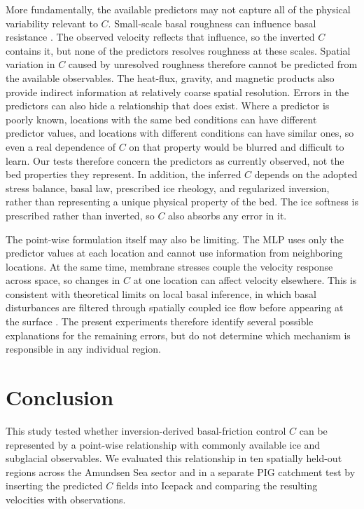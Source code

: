 \documentclass[review,jog]{igs}
\begin{document}
More fundamentally, the available predictors may not capture all of the
physical variability relevant to $C$. Small-scale basal roughness can
influence basal resistance \citep{hoffman2022impact}. The observed velocity reflects
that influence, so the inverted $C$ contains it, but none of the predictors resolves
roughness at these scales. Spatial variation in $C$ caused by unresolved roughness
therefore cannot be predicted from the available observables.
The heat-flux, gravity, and magnetic products also provide indirect information at relatively
coarse spatial resolution. Errors in the predictors can also hide a relationship that
does exist. Where a predictor is poorly known, locations with the same bed
conditions can have different predictor values, and locations with different
conditions can have similar ones, so even a real dependence of $C$ on that
property would be blurred and difficult to learn. Our tests therefore concern
the predictors as currently observed, not the bed properties they represent. In addition, the inferred $C$ depends on the
adopted stress balance, basal law, prescribed ice rheology, and regularized
inversion, rather than representing a unique physical property of the bed.
The ice softness is prescribed rather than inverted, so $C$ also absorbs any error in it.

The point-wise formulation itself may also be limiting. The MLP uses only the
predictor values at each location and cannot use information from neighboring
locations. At the same time, membrane stresses couple the velocity response
across space, so changes in $C$ at one location can affect velocity elsewhere.
This is consistent with theoretical limits on local basal inference, in which
basal disturbances are filtered through spatially coupled ice flow before
appearing at the surface
\citep{gudmundsson2003transmission,raymond2005relationship,
gudmundsson2008limit}. The present experiments therefore identify several
possible explanations for the remaining errors, but do not determine which
mechanism is responsible in any individual region.


\section{Conclusion}

This study tested whether inversion-derived basal-friction control $C$ can be represented by a point-wise relationship with commonly available ice and subglacial observables. We evaluated this relationship in ten spatially held-out regions across the Amundsen Sea sector and in a separate PIG catchment test by inserting the predicted $C$ fields into Icepack and comparing the resulting velocities with observations.
\end{document}
